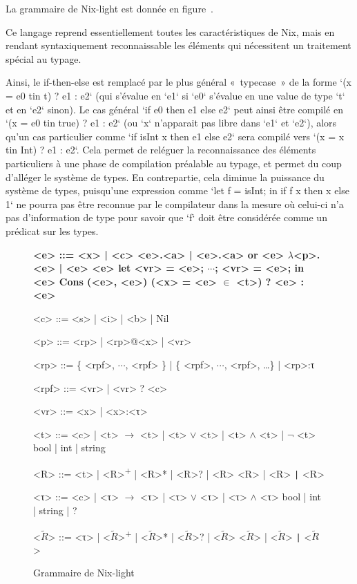 La grammaire de Nix-light est donnée en figure .

Ce langage reprend essentiellement toutes les caractéristiques de Nix, mais en
rendant syntaxiquement reconnaissable les éléments qui nécessitent un traitement
spécial au typage.

Ainsi, le if-then-else est remplacé par le plus général « typecase » de la
forme `(x = e0 tin t) ? e1 : e2` (qui s'évalue en `e1` si `e0` s'évalue en une
value de type `t` et en `e2` sinon). Le cas général `if e0 then e1 else e2`
peut ainsi être compilé en `(x = e0 tin true) ? e1 : e2` (ou `x` n'apparait pas
libre dans `e1` et `e2`), alors qu'un cas particulier comme
`if isInt x then e1 else e2` sera compilé vers `(x = x tin Int) ? e1 : e2`.
Cela permet de reléguer la reconnaissance des éléments particuliers à une phase
de compilation préalable au typage, et permet du coup d'alléger le système de
types. En contrepartie, cela diminue la puissance du système de types,
puisqu'une expression comme `let f = isInt; in if f x then x else 1` ne pourra
pas être reconnue par le compilateur dans la mesure où celui-ci n'a pas
d'information de type pour savoir que `f` doit être considérée comme un
prédicat sur les types.

\begin{figure}
  \begin{grammar}
    \def\tt{\ensuremath{\tilde{t}}}
    \def\RR{\ensuremath{\tilde{R}}}
    \bfseries
    <e> ::=
      <x> | <c>
      \alt <e>.<a> | <e>.<a> or <e>
      \alt $\lambda$<p>.<e> | <e> <e>
      \alt let <vr> = <e>; $\cdots{}$; <vr> = <e>; in <e>
      \alt Cons (<e>, <e>)
      \alt (<x> = <e> $\in$ <t>) ? <e> : <e>

    <c> ::= <s> | <i> | <b> | Nil

    <p> ::= <rp> | <rp>@<x> | <vr>

    <rp> ::= \{ <rpf>, $\cdots$, <rpf> \}
      | \{ <rpf>, $\cdots$, <rpf>, \ldots \}
      | <rp>:τ

    <rpf> ::= <vr> | <vr> ? <c>

    <vr> ::= <x> | <x>:<τ>

    <t> ::= <c> | <t> $\rightarrow$ <t>
      | <t> $\vee$ <t> | <t> $\wedge$ <t> | $\lnot$ <t>
      \alt [<R>]
      \alt bool | int | string

    <R> ::= <t> | <R>\textsuperscript{+} | <R>* | <R>? | <R> <R>
      | <R> \texttt{|} <R>

    <τ> ::= <c> | <τ> $\rightarrow$ <τ>
      | <τ> $\vee$ <τ> | <τ> $\wedge$ <τ>
      \alt [<R>]
      \alt bool | int | string | ?

    <\RR> ::= <τ> | <\RR>\textsuperscript{+} | <\RR>* | <\RR>? | <\RR> <\RR>
      | <\RR> \texttt{|} <\RR>
  \end{grammar}
  \caption{Grammaire de Nix-light\label{nix-light::grammar}}
\end{figure}
